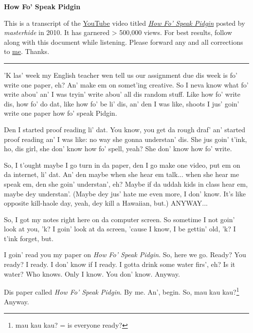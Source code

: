 \documentclass[12pt]{article}%
\begin{document}
\begin{center}{\large\bf How Fo' Speak Pidgin}\end{center}


This is a transcript of the \href{http://youtube.com/}{YouTube} video titled {\em\href{http://youtu.be/GLmfQSR3EI0}{How Fo' Speak Pidgin}} posted by {\em masterhide} in 2010. It has garnered > 500,000 views. For best results, follow along with this document while listening. Please forward any and all corrections to \href{mailto:pidgin@patton-petty.net}{me}. Thanks.

\vspace{5mm}\hrule\vspace{5mm}

'K las' week my English teacher wen tell us our assignment due dis week is fo' write one paper, eh? An' make em on somet'ing creative. So I neva know what fo' write abou' an' I was tryin' write abou' all dis random stuff. Like how fo' write dis, how fo' do dat, like how fo' be li' dis, an' den I was like, shoots I jus' goin' write one paper how fo' speak Pidgin.

Den I started proof reading li' dat. You know, you get da rough draf' an' started proof reading an' I was like: no way she gonna understan' dis. She jus goin' t'ink, ho, dis girl, she don' know how fo' spell, yeah? She don' know how fo' write. 

So, I t'ought maybe I go turn in da paper, den I go make one video, put em on da internet, li' dat. An' den maybe when she hear em talk... when she hear me speak em, den she goin' understan', eh? Maybe if da uddah kids in class hear em, maybe dey understan'. (Maybe dey jus' hate me even more, I don' know. It's like opposite kill-haole day, yeah, dey kill a Hawaiian, but.) ANYWAY...

So, I got my notes right here on da computer screen. So sometime I not goin' look at you, 'k? I goin' look at da screen, 'cause I know, I be gettin' old, 'k? I t'ink forget, but.

I goin' read you my paper on {\em How Fo' Speak Pidgin}. So, here we go. Ready? You ready? I ready. I don' know if I ready. I gotta drink some water firs', eh? Is it water? Who knows. Only I know. You don' know. Anyway.

Dis paper called {\em How Fo' Speak Pidgin}. By me. An', begin. So, mau kau kau?\footnote{mau kau kau? = is everyone ready?} Anyway.
\end{document}
